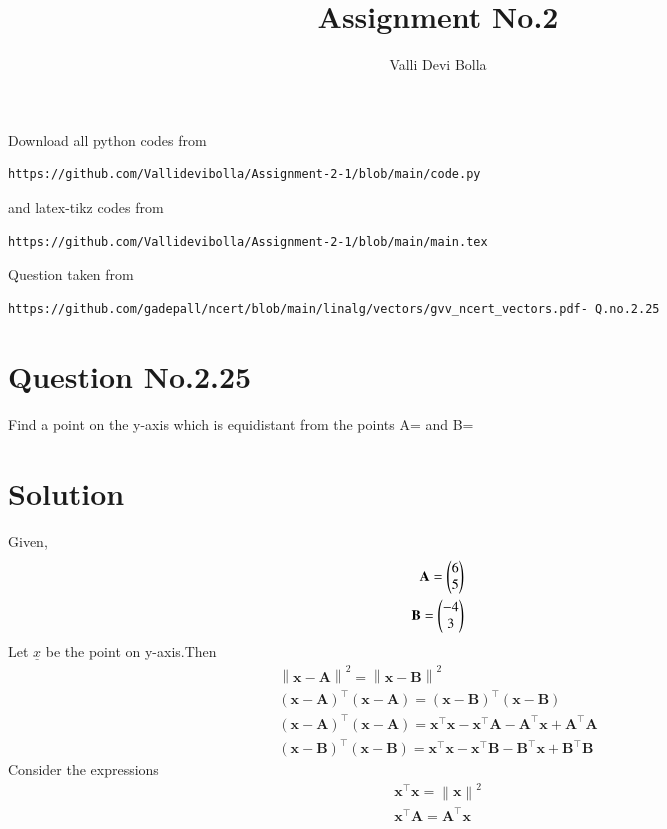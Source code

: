 \documentclass[journal,12pt,twocolumn]{IEEEtran}
\newcommand{\norm}[1]{\left\lVert#1\right\rVert}
\begin{document}
\makeatother
\let\StandardTheFigure\thefigure
\let\vec\mathbf
\renewcommand{\thefigure}{\theproblem}
\def\putbox#1#2#3{\makebox[0in][l]{\makebox[#1][l]{}\raisebox{\baselineskip}[0in][0in]{\raisebox{#2}[0in][0in]{#3}}}}
     \def\rightbox#1{\makebox[0in][r]{#1}}
     \def\centbox#1{\makebox[0in]{#1}}
     \def\topbox#1{\raisebox{-\baselineskip}[0in][0in]{#1}}
     \def\midbox#1{\raisebox{-0.5\baselineskip}[0in][0in]{#1}}
\vspace{3cm}
\title{Assignment No.2}
\author{Valli Devi Bolla}
\maketitle
\newpage
\bigskip
\renewcommand{\thefigure}{\theenumi}
\renewcommand{\thetable}{\theenumi}
Download all python codes from 
\begin{lstlisting}
https://github.com/Vallidevibolla/Assignment-2-1/blob/main/code.py
\end{lstlisting}
%
and latex-tikz codes from 
%
\begin{lstlisting}
https://github.com/Vallidevibolla/Assignment-2-1/blob/main/main.tex
\end{lstlisting}
%
Question taken from
\begin{lstlisting}
https://github.com/gadepall/ncert/blob/main/linalg/vectors/gvv_ncert_vectors.pdf- Q.no.2.25 
\end{lstlisting}
%
\section{Question No.2.25}
Find a point on the y-axis which is equidistant from the points A= and B=
\section{Solution}
Given, 
\begin{align}
\vec{A}=\myvec{6\\5} \\
\vec{B}=\myvec{-4\\3}
\end{align}
Let $\underline{x}$ be the point on y-axis.Then\\
\begin{align}
\boxed{\norm{\vec{x}-\vec{A}}^2 =\norm{\vec{x}-\vec{B}}^2 }\\
\boxed{(\vec{x}-\vec{A})^{\top}(\vec{x}-\vec{A})=(\vec{x}-\vec{B})^{\top}(\vec{x}-\vec{B})}
\\
(\vec{x}-\vec{A})^{\top}(\vec{x}-\vec{A})=\vec{x}^{\top} \vec{x}-\vec{x}^{\top} \vec{A}-\vec{A}^{\top} \vec{x}+\vec{A}^{\top} \vec{A}
\\
(\vec{x}-\vec{B})^{\top}(\vec{x}-\vec{B})=\vec{x}^{\top} \vec{x}-\vec{x}^{\top} \vec{B}-\vec{B}^{\top} \vec{x}+\vec{B}^{\top} \vec{B}
\end{align}
Consider the expressions 
\begin{align}
\vec{x}^{\top} \vec{x}=\norm{\vec{x}}^2\\
\vec{x}^{\top} \vec{A}=\vec{A}^{\top} \vec{x}
\end{align}
\end{document}
